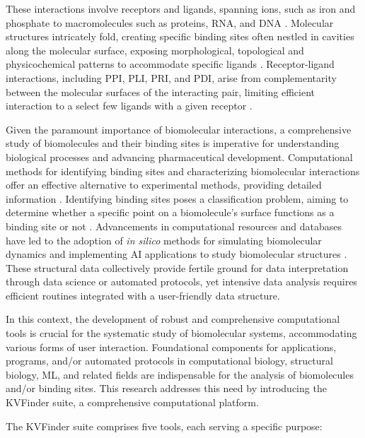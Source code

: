 \documentclass[Ingles]{phdthesis}
\begin{document}
These interactions involve receptors and ligands, spanning ions, such as iron and phosphate to macromolecules such as proteins, RNA, and DNA \cite{oliveira2014}. Molecular structures intricately fold, creating specific binding sites often nestled in cavities along the molecular surface, exposing morphological, topological and physicochemical patterns to accommodate specific ligands \cite{henrich2010,guerra2021}. Receptor-ligand interactions, including \ac{PPI}, \ac{PLI}, \ac{PRI}, and \ac{PDI}, arise from complementarity between the molecular surfaces of the interacting pair, limiting efficient interaction to a select few ligands with a given receptor \cite{henrich2010,simoes2017}.

Given the paramount importance of biomolecular interactions, a comprehensive study of biomolecules and their binding sites is imperative for understanding biological processes and advancing pharmaceutical development. Computational methods for identifying binding sites and characterizing biomolecular interactions offer an effective alternative to experimental methods, providing detailed information \cite{simoes2017}. Identifying binding sites poses a classification problem, aiming to determine whether a specific point on a biomolecule's surface functions as a binding site or not \cite{sotriffer2002,henrich2010,simoes2017}. Advancements in computational resources and databases have led to the adoption of \textit{in silico} methods for simulating biomolecular dynamics and implementing \ac{AI} applications to study biomolecular structures \cite{tunyasuvunakool2021}. These structural data collectively provide fertile ground for data interpretation through data science or automated protocols, yet intensive data analysis requires efficient routines integrated with a user-friendly data structure.

In this context, the development of robust and comprehensive computational tools is crucial for the systematic study of biomolecular systems, accommodating various forms of user interaction. Foundational components for applications, programs, and/or automated protocols in computational biology, structural biology, \ac{ML}, and related fields are indispensable for the analysis of biomolecules and/or binding sites. This research addresses this need by introducing the KVFinder suite, a comprehensive computational platform.

The KVFinder suite comprises five tools, each serving a specific purpose:
\end{document}
